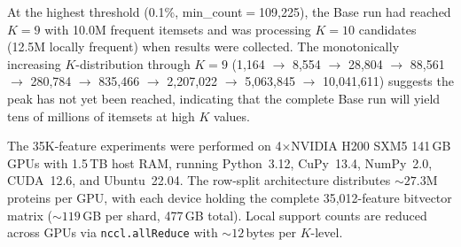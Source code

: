 At the highest threshold (0.1\%, min\_count$=$109,225), the Base run had
reached $K{=}9$ with 10.0M frequent itemsets and was processing $K{=}10$
candidates (12.5M locally frequent) when results were collected. The
monotonically increasing $K$-distribution through $K{=}9$ (1,164 $\to$
8,554 $\to$ 28,804 $\to$ 88,561 $\to$ 280,784 $\to$ 835,466 $\to$
2,207,022 $\to$ 5,063,845 $\to$ 10,041,611) suggests the peak has not
yet been reached, indicating that the complete Base run will yield tens of
millions of itemsets at high $K$ values.


%


The 35K-feature experiments were performed on 4$\times$NVIDIA H200 SXM5
141\,GB GPUs with 1.5\,TB host RAM, running Python~3.12, CuPy~13.4,
NumPy~2.0, CUDA~12.6, and Ubuntu~22.04. The row-split architecture
distributes ${\sim}27.3$M proteins per GPU, with each device holding
the complete 35,012-feature bitvector matrix (${\sim}119$\,GB per shard,
477\,GB total). Local support counts are reduced across GPUs via
\texttt{nccl.allReduce} with ${\sim}12$\,bytes per $K$-level.


%
%
